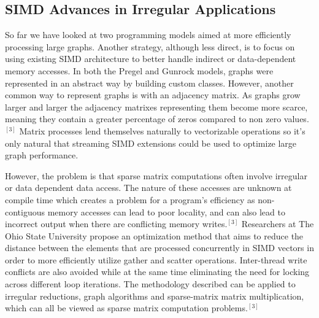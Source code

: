 \documentclass[conference]{IEEEtran}
\begin{document}
\subsection{SIMD Advances in Irregular Applications}

So far we have looked at two programming models aimed at more efficiently processing large graphs.  Another strategy, although less direct, is to focus on using existing SIMD architecture to better handle indirect or data-dependent memory accesses.  In both the Pregel and Gunrock models, graphs were represented in an abstract way by building custom classes.  However, another common way to represent graphs is with an adjacency matrix.  As graphs grow larger and larger the adjacency matrixes representing them become more scarce, meaning they contain a greater percentage of zeros compared to non zero values.$^{[3]}$  Matrix processes lend themselves naturally to vectorizable operations so it's only natural that streaming SIMD extensions could be used to optimize large graph performance.  

However, the problem is that sparse matrix computations often involve irregular or data dependent data access.  The nature of these accesses are unknown at compile time which creates a problem for a program's efficiency as non-contiguous memory accesses can lead to poor locality, and can also lead to incorrect output when there are conflicting memory writes.$^{[3]}$  Researchers at The Ohio State University propose an optimization method that aims to reduce the distance between the elements that are processed concurrently in SIMD vectors in order to more efficiently utilize gather and scatter operations.  Inter-thread write conflicts are also avoided while at the same time eliminating the need for locking across different loop iterations.  The methodology described can be applied to irregular reductions, graph algorithms and sparse-matrix matrix multiplication, which can all be viewed as sparse matrix computation problems.$^{[3]}$  
\end{document}
